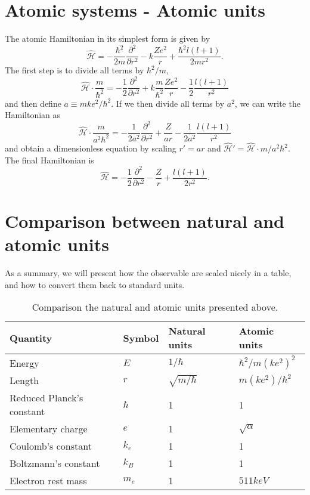 \section{Atomic systems - Atomic units}
The atomic Hamiltonian in its simplest form is given by 
\begin{equation}
\hat{\mathcal{H}}=-\frac{\hbar^2}{2m}\frac{\partial^2}{\partial r^2}-k\frac{Ze^2}{r}+\frac{\hbar^2l(l+1)}{2mr^2}.
\label{eq:HamiltonianAtomic}
\end{equation}
The first step is to divide all terms by $\hbar^2/m$,
\begin{equation}
\hat{\mathcal{H}}\cdot\frac{m}{\hbar^2}=-\frac{1}{2}\frac{\partial^2}{\partial r^2}+k\frac{m}{\hbar^2}\frac{Ze^2}{r}-\frac{1}{2}\frac{l(l+1)}{r^2}
\end{equation}
and then define $a\equiv mke^2/\hbar^2$. If we then divide all terms by $a^2$, we can write the Hamiltonian as
\begin{equation}
\hat{\mathcal{H}}\cdot\frac{m}{a^2\hbar^2}=-\frac{1}{2a^2}\frac{\partial^2}{\partial r^2}+\frac{Z}{ar}-\frac{1}{2a^2}\frac{l(l+1)}{r^2}
\end{equation}
and obtain a dimensionless equation by scaling $r'=ar$ and $\hat{\mathcal{H}}'=\hat{\mathcal{H}}\cdot m/a^2\hbar^2$. The final Hamiltonian is
\begin{equation}
\hat{\mathcal{H}}=-\frac{1}{2}\frac{\partial^2}{\partial r^2}-\frac{Z}{r}+\frac{l(l+1)}{2r^2}.
\end{equation}

\section{Comparison between natural and atomic units}
As a summary, we will present how the observable are scaled nicely in a table, and how to convert them back to standard units.
\begin{table} [H]
	\caption{Comparison the natural and atomic units presented above.  \vspace{2mm}}
	\begin{tabularx}{\textwidth}{X|XXX} \hline\hline
		\label{tab:energies2P2D}
		Quantity & Symbol & Natural units & Atomic units \\ \hline
		Energy & $E$ & $1/\hbar$ & $\hbar^2/m(ke^2)^2$\\ 
		Length & $r$ & $\sqrt{m/\hbar}$ & $m(ke^2)/\hbar^2$\\
		Reduced Planck's constant & $\hbar$ & 1 & 1 \\
		Elementary charge & $e$ & 1 & $\sqrt{\alpha}$ \\
		Coulomb's constant & $k_e$ & 1 & 1 \\
		Boltzmann's constant & $k_B$ & 1 & 1 \\
		Electron rest mass & $m_e$ & 1 & $511 keV$ \\ \hline\hline
	\end{tabularx}
\end{table}

